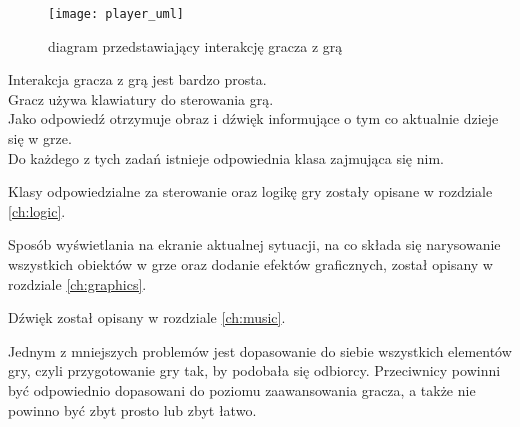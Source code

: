 \newpage
\begin{wrapfigure}{l}{0.5\textwidth}
	\centering
	\noindent\texttt{[image: player\_uml]}
	\caption{diagram przedstawiający interakcję gracza z grą}
\end{wrapfigure}
Interakcja gracza z grą jest bardzo prosta.\\
Gracz używa klawiatury do sterowania grą.\\
Jako odpowiedź otrzymuje obraz i dźwięk informujące o tym co aktualnie dzieje się w grze.\\
Do każdego z tych zadań istnieje odpowiednia klasa zajmująca się nim.

Klasy odpowiedzialne za sterowanie oraz logikę gry zostały opisane w rozdziale \ref{ch:logic}.

Sposób wy\'swietlania na ekranie aktualnej sytuacji, na co składa się narysowanie wszystkich obiektów w grze oraz dodanie efektów graficznych, został opisany w rozdziale \ref{ch:graphics}.

Dźwięk został opisany w rozdziale \ref{ch:music}.

Jednym z mniejszych problemów jest dopasowanie do siebie wszystkich elementów gry, czyli przygotowanie gry tak, by podobała się odbiorcy. Przeciwnicy powinni być odpowiednio dopasowani do poziomu zaawansowania gracza, a także nie powinno być zbyt prosto lub zbyt łatwo.

\cleardoublepage